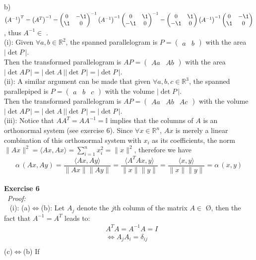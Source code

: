 \documentclass[12pt]{article}
\def\dotp#1#2{\langle#1,#2\rangle}
\def\ss#1#2{\sum_{#1=1}^{#2}}
\def\ep#1#2{{\bf Exercise #1}\\~{\it Proof:}\\~#2\\[1em]}
\def\inn#1#2{(#1): #2\\[0.5em]}
\newcommand{\eq}[1]{\begin{align*}#1\end{align*}}
\begin{document}
{ b) ${\left(A^{-1}\right)}^{T}={\left(A^{T}\right)}^{-1}={\begin{pmatrix}0&-\1\\\1&0\end{pmatrix}}^{-1}\left(A^{-1}\right)^{-1}{\begin{pmatrix}0&\1\\ -\1&0\end{pmatrix}}^{-1}=\begin{pmatrix}0&\1\\ -\1&0\end{pmatrix}{\left(A^{-1}\right)}^{-1}\begin{pmatrix}0&-\1\\\1&0\end{pmatrix}$, thus $A^{-1}\in$ \Sp.\\[0.5 em]
 \inn{i}{
 	Given $\forall a,b\in\mathbb{R}^2$, the spanned parallelogram is 
	$P=\begin{pmatrix}a&b\end{pmatrix}$
	with the area $|\det P\,|$.\\
	Then the transformed parallelogram is $AP=\begin{pmatrix}Aa&Ab\end{pmatrix}$
	with the area $|\det AP\,|=|\det A\,||\det P\,|=|\det P\,|$.
 }
 \inn{ii}{
 	A similar argument can be made that given $\forall a,b,c\in\mathbb{R}^3$, the spanned parallepiped is
	$P=\begin{pmatrix}a&b&c\end{pmatrix}$
	with the volume $|\det P\,|$.\\
	Then the transformed parallelogram is $AP=\begin{pmatrix}Aa&Ab&Ac\end{pmatrix}$
	with the volume $|\det AP\,|=|\det A\,||\det P\,|=|\det P\,|$.
 }
 \inn{iii}{
 	Notice that $AA^{T}=AA^{-1}=\mathbb{I}$ implies that the columns of $A$ is an orthonormal system (see exercise 6). Since $\forall x\in\mathbb{R}^n$, $Ax$ is merely a linear combination of this orthonormal system with $x_i$ as its coefficients, the norm $\|Ax\|^2=\dotp{Ax}{Ax}=\ss{i}{n}x_i^2=\|x\|^2$, therefore we have
	\[
	\alpha\,(Ax,Ay)=\frac{\dotp{Ax}{Ay}}{\|Ax\|\|Ay\|}=\frac{\dotp{A^TAx}{y}}{\|x\|\|y\|}=\frac{\dotp{x}{y}}{{\|x\|\|y\|}}=\alpha\,(x,y)
	\]
 }
 \ep{6}{
 	\inn{i}{
	(a)$\iff$(b): Let $A_j$ denote the $j$th column of the matrix $A\in$ \O, 
	then the fact that $A^{-1}=A^{T}$ leads to:
	\eq{
	&A^{T}A=A^{-1}A=I\\
	&\iff A_jA_i=\delta_{ij}\\
	}
	(c)$\iff$(b) If
	}
 }
 }
\end{document}
